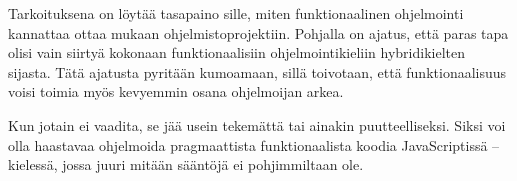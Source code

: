Tarkoituksena on löytää tasapaino sille, miten funktionaalinen ohjelmointi kannattaa ottaa mukaan ohjelmistoprojektiin. Pohjalla on ajatus, että paras tapa olisi vain siirtyä kokonaan funktionaalisiin ohjelmointikieliin hybridikielten sijasta. Tätä ajatusta pyritään kumoamaan, sillä toivotaan, että funktionaalisuus voisi toimia myös kevyemmin osana ohjelmoijan arkea.

Kun jotain ei vaadita, se jää usein tekemättä tai ainakin puutteelliseksi. Siksi voi olla haastavaa ohjelmoida pragmaattista funktionaalista koodia JavaScriptissä – kielessä, jossa juuri mitään sääntöjä ei pohjimmiltaan ole.

